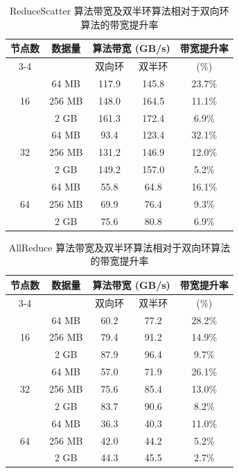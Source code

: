 \begin{table}[!htbp]
\centering
\caption{ReduceScatter 算法带宽及双半环算法相对于双向环算法的带宽提升率}
\label{tab:reducescatter_bandwidth_improvement}
\begin{tabular}{c c c c c}
\toprule
\multirow{2}{*}{节点数} & \multirow{2}{*}{数据量} &
\multicolumn{2}{c}{算法带宽 (GB/s)} &
带宽提升率 \\
\cmidrule(lr){3-4}
 & & 双向环 & 双半环 & (\%) \\
\midrule
\multirow{3}{*}{16}
 & 64 MB  & 117.9 & 145.8 & 23.7\% \\
 & 256 MB & 148.0 & 164.5 & 11.1\% \\
 & 2 GB   & 161.3 & 172.4 & 6.9\% \\
\midrule
\multirow{3}{*}{32}
 & 64 MB  & 93.4  & 123.4 & 32.1\% \\
 & 256 MB & 131.2 & 146.9 & 12.0\% \\
 & 2 GB   & 149.2 & 157.0 & 5.2\% \\
\midrule
\multirow{3}{*}{64}
 & 64 MB  & 55.8  & 64.8  & 16.1\% \\
 & 256 MB & 69.9  & 76.4  & 9.3\% \\
 & 2 GB   & 75.6  & 80.8  & 6.9\% \\
\bottomrule
\end{tabular}
\end{table}



\begin{table}[!htbp]
\centering
\caption{AllReduce 算法带宽及双半环算法相对于双向环算法的带宽提升率}
\label{tab:allreduce_bandwidth_improvement}
\begin{tabular}{c c c c c}
\toprule
\multirow{2}{*}{节点数} & \multirow{2}{*}{数据量} &
\multicolumn{2}{c}{算法带宽 (GB/s)} &
带宽提升率 \\
\cmidrule(lr){3-4}
 & & 双向环 & 双半环 & (\%) \\
\midrule
\multirow{3}{*}{16}
 & 64 MB  & 60.2 & 77.2 & 28.2\% \\
 & 256 MB & 79.4 & 91.2 & 14.9\% \\
 & 2 GB   & 87.9 & 96.4 & 9.7\% \\
\midrule
\multirow{3}{*}{32}
 & 64 MB  & 57.0 & 71.9 & 26.1\% \\
 & 256 MB & 75.6 & 85.4 & 13.0\% \\
 & 2 GB   & 83.7 & 90.6 & 8.2\% \\
\midrule
\multirow{3}{*}{64}
 & 64 MB  & 36.3 & 40.3 & 11.0\% \\
 & 256 MB & 42.0 & 44.2 & 5.2\% \\
 & 2 GB   & 44.3 & 45.5 & 2.7\% \\
\bottomrule
\end{tabular}
\end{table}



